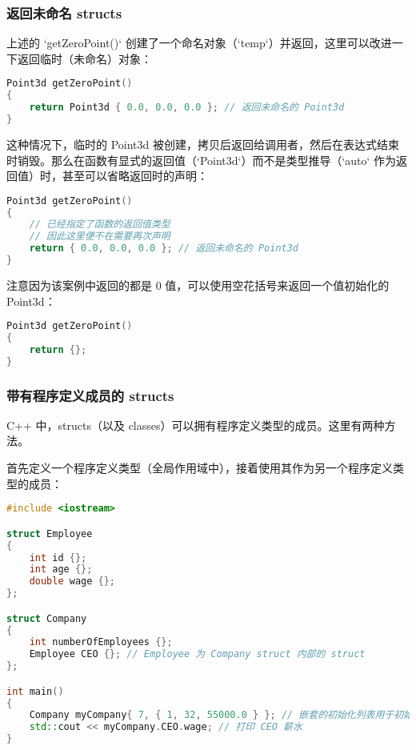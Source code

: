 \documentclass[../../LearnCpp.tex]{subfiles}
\begin{document}
\subsubsection*{返回未命名 structs}

上述的 `getZeroPoint()` 创建了一个命名对象（`temp`）并返回，这里可以改进一下返回临时（未命名）对象：

\begin{lstlisting}[language=C++]
Point3d getZeroPoint()
{
    return Point3d { 0.0, 0.0, 0.0 }; // 返回未命名的 Point3d
}
\end{lstlisting}

这种情况下，临时的 Point3d 被创建，拷贝后返回给调用者，然后在表达式结束时销毁。那么在函数有显式的返回值（`Point3d`）而不是类型推导（`auto` 作为返回值）时，甚至可以省略返回时的声明：

\begin{lstlisting}[language=C++]
Point3d getZeroPoint()
{
    // 已经指定了函数的返回值类型
    // 因此这里便不在需要再次声明
    return { 0.0, 0.0, 0.0 }; // 返回未命名的 Point3d
}
\end{lstlisting}

注意因为该案例中返回的都是 0 值，可以使用空花括号来返回一个值初始化的 Point3d：

\begin{lstlisting}[language=C++]
Point3d getZeroPoint()
{
    return {};
}
\end{lstlisting}

\subsubsection*{带有程序定义成员的 structs}

C++ 中，structs（以及 classes）可以拥有程序定义类型的成员。这里有两种方法。

首先定义一个程序定义类型（全局作用域中），接着使用其作为另一个程序定义类型的成员：

\begin{lstlisting}[language=C++]
#include <iostream>

struct Employee
{
    int id {};
    int age {};
    double wage {};
};

struct Company
{
    int numberOfEmployees {};
    Employee CEO {}; // Employee 为 Company struct 内部的 struct
};

int main()
{
    Company myCompany{ 7, { 1, 32, 55000.0 } }; // 嵌套的初始化列表用于初始化 Employee
    std::cout << myCompany.CEO.wage; // 打印 CEO 薪水
}
\end{lstlisting}
\end{document}
